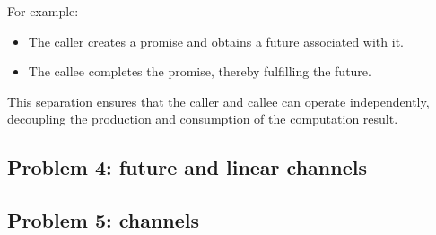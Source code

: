 For example:
\begin{itemize}
    \item The caller creates a promise and obtains a future associated with it.
    \item The callee completes the promise, thereby fulfilling the future.
\end{itemize}
This separation ensures that the caller and callee can operate independently, decoupling the production and consumption of the computation result.

\subsection{Problem 4: future and linear channels}
\subsection{Problem 5: channels}
